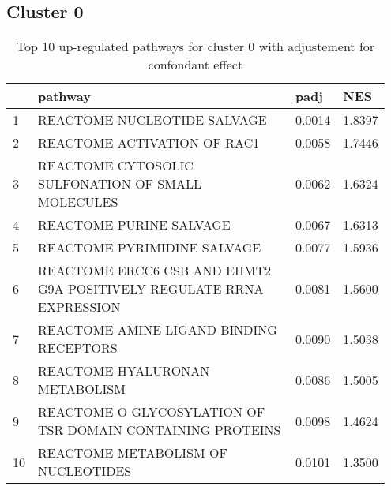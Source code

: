 \documentclass{article}
\begin{document}
\subsection{Cluster 0 }
\begin{table}[H]
\centering
\begin{tabular}{p{0.05\linewidth}p{0.7\linewidth}p{0.1\linewidth}p{0.1\linewidth}}
  \hline
 & pathway & padj & NES \\ 
  \hline
1 & REACTOME NUCLEOTIDE SALVAGE & 0.0014 & 1.8397 \\ 
  2 & REACTOME ACTIVATION OF RAC1 & 0.0058 & 1.7446 \\ 
  3 & REACTOME CYTOSOLIC SULFONATION OF SMALL MOLECULES & 0.0062 & 1.6324 \\ 
  4 & REACTOME PURINE SALVAGE & 0.0067 & 1.6313 \\ 
  5 & REACTOME PYRIMIDINE SALVAGE & 0.0077 & 1.5936 \\ 
  6 & REACTOME ERCC6 CSB AND EHMT2 G9A POSITIVELY REGULATE RRNA EXPRESSION & 0.0081 & 1.5600 \\ 
  7 & REACTOME AMINE LIGAND BINDING RECEPTORS & 0.0090 & 1.5038 \\ 
  8 & REACTOME HYALURONAN METABOLISM & 0.0086 & 1.5005 \\ 
  9 & REACTOME O GLYCOSYLATION OF TSR DOMAIN CONTAINING PROTEINS & 0.0098 & 1.4624 \\ 
  10 & REACTOME METABOLISM OF NUCLEOTIDES & 0.0101 & 1.3500 \\ 
   \hline
\end{tabular}
\caption{Top 10 up-regulated pathways for cluster 0 with adjustement for confondant effect} 
\label{tab:q3_2_conf_0}
\end{table}
\end{document}
